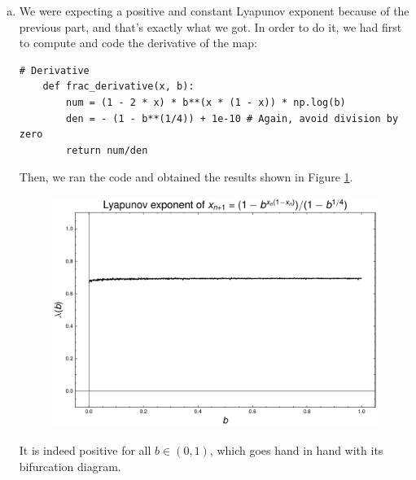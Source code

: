 \begin{enumerate}[(a)]
    \item We were expecting a positive and constant Lyapunov exponent because of the previous part,
    and that's exactly what we got. In order to do it, we had first to compute and code
    the derivative of the map:
    \begin{lstlisting}[style=pythonstyle]
    # Derivative
    def frac_derivative(x, b):
        num = (1 - 2 * x) * b**(x * (1 - x)) * np.log(b)
        den = - (1 - b**(1/4)) + 1e-10 # Again, avoid division by zero
        return num/den
    \end{lstlisting}
    Then, we ran the code and obtained the results shown in Figure \ref{fig:3c}.
    \newpage
    \begin{figure}[!h]
        \centering
        \includegraphics[scale=0.65]{images/frac_lya.pdf}
        \label{fig:3c}
    \end{figure}

    It is indeed positive for all $b \in (0,1)$, which goes hand in hand with its
    bifurcation diagram.
\end{enumerate}



% 
% 


